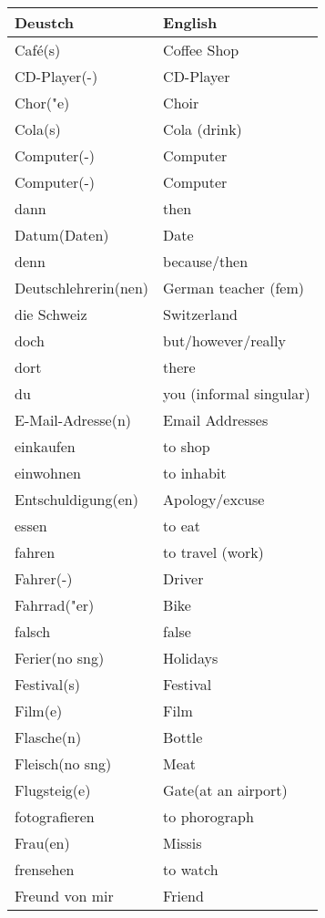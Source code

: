 \documentclass{article}
\renewcommand{\arraystretch}{1}
\begin{document}
\hfill
\begin{minipage}{0.48\textwidth}
    \centering
    \renewcommand{\arraystretch}{1.5}
    \begin{tabular}{|>{\raggedright\arraybackslash}p{3.5cm}|>{\raggedright\arraybackslash}p{3.5cm}|}
        \hline
        \rowcolor{gray!20} \textbf{Deustch} & \textbf{English} \\
        \hline
        Café(s) & Coffee Shop \\\hline
        CD-Player(-) & CD-Player \\\hline
        Chor("e) & Choir \\\hline
        Cola(s) & Cola (drink) \\\hline
        Computer(-) & Computer \\\hline
        Computer(-) & Computer \\\hline
        dann & then \\\hline
        Datum(Daten) & Date \\\hline
        denn & because/then \\\hline
        Deutschlehrerin(nen) & German teacher (fem) \\\hline
        die Schweiz & Switzerland \\\hline
        doch & but/however/really \\\hline
        dort & there \\\hline
        du & you (informal singular) \\\hline
        E-Mail-Adresse(n) & Email Addresses \\\hline
        einkaufen & to shop \\\hline
        einwohnen & to inhabit \\\hline
        Entschuldigung(en) & Apology/excuse \\\hline
        essen & to eat \\\hline
        fahren & to travel (work) \\\hline
        Fahrer(-) & Driver \\\hline
        Fahrrad("er) & Bike \\\hline
        falsch & false \\\hline
        Ferier(no sng) & Holidays \\\hline
        Festival(s) & Festival \\\hline
        Film(e) & Film \\\hline
        Flasche(n) & Bottle \\\hline
        Fleisch(no sng) & Meat \\\hline
        Flugsteig(e) & Gate(at an airport) \\\hline
        fotografieren & to phorograph \\\hline
        Frau(en) & Missis \\\hline
        frensehen & to watch  \\\hline
        Freund von mir & Friend \\\hline
    \end{tabular}
\end{minipage}
\end{document}

